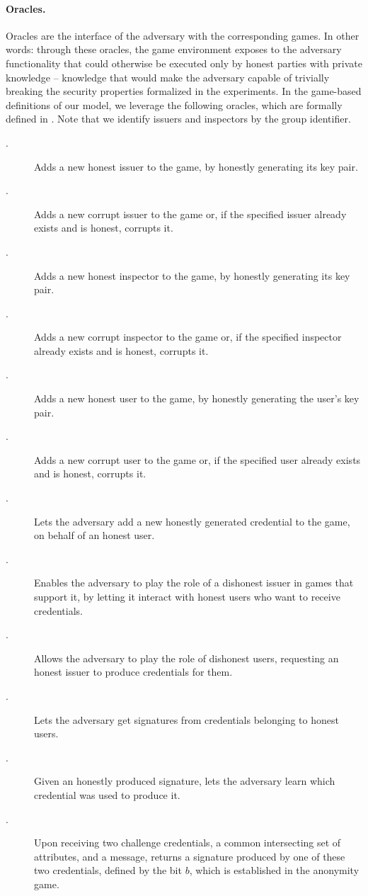 \paragraph{Oracles.} %
Oracles are the interface of the adversary with the corresponding games. In
other words: through these oracles, the game environment exposes to the adversary
functionality that could otherwise be executed only by honest parties with
private knowledge -- knowledge that would make the adversary capable of
trivially breaking the security properties formalized in the experiments.
In the game-based definitions of our \GSAC model, we leverage the following
oracles, which are formally defined in . Note that we
identify issuers and inspectors by the group identifier.

\begin{description}
\item[\HIGEN.] Adds a new honest issuer to the game, by honestly generating
  its key pair.
\item[\CIGEN.] Adds a new corrupt issuer to the game or, if the specified issuer
  already exists and is honest, corrupts it.
\item[\HOGEN.] Adds a new honest inspector to the game, by honestly generating
  its key pair.
\item[\COGEN.] Adds a new corrupt inspector to the game or, if the specified
  inspector already exists and is honest, corrupts it. 
\item[\HUGEN.] Adds a new honest user to the game, by honestly generating
  the user's key pair.
\item[\CUGEN.] Adds a new corrupt user to the game or, if the specified
  user already exists and is honest, corrupts it.
\item[\OBTISS.] Lets the adversary add a new honestly generated credential to
  the game, on behalf of an honest user.
\item[\OBTAIN.] Enables the adversary to play the role of a dishonest issuer
  in games that support it, by letting it interact with honest users who want to
  receive credentials.
\item[\ISSUE.] Allows the adversary to play the role of dishonest users,
  requesting an honest issuer to produce credentials for them.
\item[\SIGN.] Lets the adversary get signatures from credentials belonging
  to honest users.
\item[\OPEN.] Given an honestly produced signature, lets the adversary learn
  which credential was used to produce it.
\item[\CHALb.] Upon receiving two challenge credentials, a common intersecting
  set of attributes, and a message, returns a signature produced by one of these
  two credentials, defined by the bit $b$, which is established in the anonymity
  game.
\end{description}

